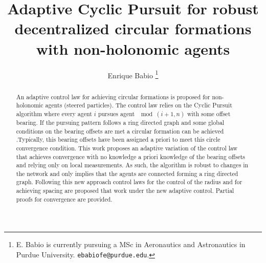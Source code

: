\documentclass[10 pt, conference]{ieeeconf}
\title{\LARGE \bf Adaptive Cyclic Pursuit for robust decentralized circular formations with non-holonomic agents
}
\author{ Enrique Babio %
	\thanks{
		E. Babio is currently pursuing a MSc in Aeronautics and Astronautics in Purdue University. {\small \tt{ebabiofe@purdue.edu}}.}
}
\begin{document}
\maketitle
\thispagestyle{empty}
\pagestyle{empty}


	\begin{abstract}
	An adaptive control law for achieving circular formations is proposed for non-holonomic agents (steered particles). The control law relies on the Cyclic Pursuit algorithm where every agent $i$ pursues agent $\mod(i+1,n)$ with some offset bearing. If the pursuing pattern follows a ring directed graph and some global conditions on the bearing offsets are met  a circular formation can be achieved .Typically, this bearing offsets have been assigned a priori to meet this circle convergence condition. This work proposes an adaptive variation of the control law that achieves convergence with no knowledge a priori knowledge of the bearing offsets and relying only on local measurements. As such, the algorithm is robust to changes in the network and only implies that the agents are connected forming a ring directed graph. Following this new approach control laws for the control of the radius and for achieving spacing are proposed that work under the new adaptive control. Partial proofs for convergence are provided.
\end{abstract}







\begin{appendix}
	
\end{appendix}



\end{document}
